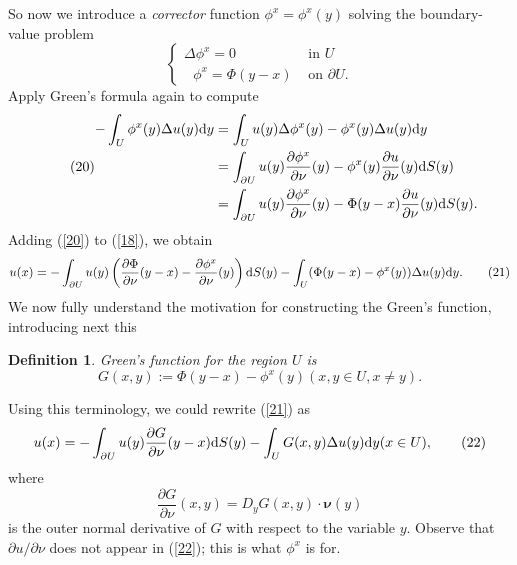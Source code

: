 \documentclass[hyperref,UTF8,12pt]{article}
\numberwithin{equation}{subsection}
\theoremstyle{plain}
\newtheorem{definition}{Definition}
\theoremstyle{definition}
\numberwithin{theorem}{section}
\numberwithin{lemma}{section}
\numberwithin{proposition}{section}
\numberwithin{remark}{section}
\numberwithin{corollary}{section}
\numberwithin{definition}{section}
\numberwithin{problem}{section}
\numberwithin{example}{section}
\def\dif{\textup{d}}
\newcommand{\ptl}{\partial}
\begin{document}
So now we introduce a \emph{corrector} function $\phi^x=\phi^x(y)$ solving the boundary-value problem\[\tag{19}\label{19}\begin{cases}
	\Delta\phi^x=0&\text{~in }U\\
	~~\:\phi^x=\Phi(y-x)&\text{~on }\ptl U.
\end{cases}\]Apply Green's formula again to compute\[\tag{20}\label{20}\begin{aligned}
-\int_U\phi^x(y)\Delta u(y)\dif y&=\int_Uu(y)\Delta\phi^x(y)-\phi^x(y)\Delta u(y)\dif y\\
&=\int_{\ptl U}u(y)\frac{\ptl\phi^x}{\ptl \nu}(y)-\phi^x(y)\frac{\ptl u}{\ptl\nu}(y)\dif S(y)\\
&=\int_{\ptl U}u(y)\frac{\ptl\phi^x}{\ptl\nu}(y)-\Phi(y-x)\frac{\ptl u}{\ptl\nu}(y)\dif S(y).
\end{aligned}\]Adding (\ref{20}) to (\ref{18}), we obtain\[u(x)=-\int_{\ptl U}u(y)\left(\frac{\ptl\Phi}{\ptl\nu}(y-x)-\frac{\ptl\phi^x}{\ptl\nu}(y)\right)\dif S(y)-\int_U(\Phi(y-x)-\phi^x(y))\Delta u(y)\dif y.\tag{21}\label{21}\]We now fully understand the motivation for constructing the Green's function, introducing next this
\begin{definition}
Green's function for the region $U$ is\[G(x,y):=\Phi(y-x)-\phi^x(y) (x,y\in U,x\neq y).\]
\end{definition}
Using this terminology, we could rewrite (\ref{21}) as\[u(x)=-\int_{\ptl U}u(y)\frac{\ptl G}{\ptl\nu}(y-x)\dif S(y)-\int_UG(x,y)\Delta u(y)\dif y(x\in U),\tag{22}\label{22}\]where \[
\frac{\ptl G}{\ptl\nu}(x,y)=D_yG(x,y)\cdot\bm{\nu}(y)\]is the outer normal derivative of $G$ with respect to the variable $y$. Observe that $\ptl u/\ptl\nu$ does not appear in (\ref{22}); this is what $\phi^x$ is for.
\end{document}
